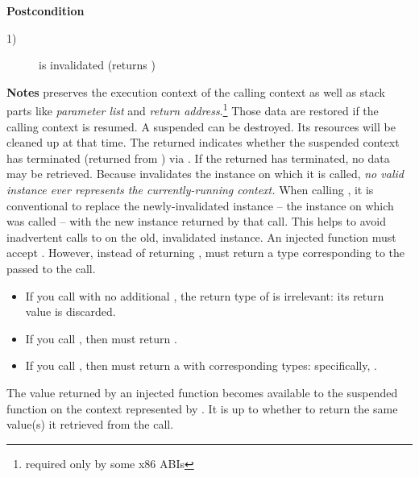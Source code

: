 {\bfseries Postcondition}
\begin{description}
    \item[1)]  is invalidated (\opbool returns )
\end{description}

{\bfseries Notes}
\newline
\resume preserves the execution context of the calling context as well as stack
parts like \emph{parameter list} and \emph{return address}.\footnote{required
only by some x86 ABIs} Those data are restored if the calling context is
resumed.
\newline
A suspended  can be destroyed. Its resources will be cleaned
up at that time.
\newline
The returned  indicates whether the suspended context
has terminated (returned from \entryfn) via \opbool. If the returned
 has terminated, no data may be retrieved.
\newline
Because \resume invalidates the instance on which it is called, \emph{no valid
\cont instance ever represents the currently-running context.}
\newline
When calling \resume, it is conventional to replace the newly-invalidated
instance -- the instance on which \resume was called -- with the new instance
returned by that \resume call. This helps to avoid inadvertent calls to \resume
on the old, invalidated instance.
\newline
An injected function  must accept .
However, instead of returning \cont,  must return a type
corresponding to the  passed to the \resumewith call.

\begin{itemize}
  \item If you call  with no additional ,
  the return type of  is irrelevant: its return value is discarded.
  \item If you call , then 
  must return .
  \item If you call ,
  then  must return a  with corresponding types:
  specifically, .
\end{itemize}

The value returned by an injected function  becomes available to the
suspended function on the context represented by . It is up
to  whether to return the same value(s) it retrieved from
the \resumewith call.

